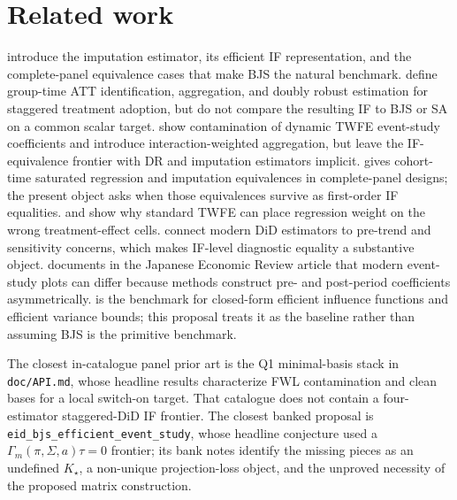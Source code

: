 \documentclass[11pt]{article}
\theoremstyle{definition}
\theoremstyle{plain}
\theoremstyle{remark}
\begin{document}
\section{Related work}
\citet[Theorem 1, Proposition 1, and Appendix B]{borusyak_jaravel_spiess_2024_restud}
introduce the imputation estimator, its efficient IF representation, and the
complete-panel equivalence cases that make BJS the natural benchmark.
\citet[Theorems 1--2 and Section 3.2]{callaway_santanna_2021_joe} define
group-time ATT identification, aggregation, and doubly robust estimation for
staggered treatment adoption, but do not compare the resulting IF to BJS or
SA on a common scalar target.  \citet[Theorem 1 and Section 3.3]{sun_abraham_2021_joe}
show contamination of dynamic TWFE event-study coefficients and introduce
interaction-weighted aggregation, but leave the IF-equivalence frontier with
DR and imputation estimators implicit.  \citet[Proposition 3.1 and Section
5]{wooldridge_2023_ectj} gives cohort-time saturated regression and
imputation equivalences in complete-panel designs; the present object asks
when those equivalences survive as first-order IF equalities.  \citet{
dechaisemartin_dhaultfoeuille_2020_aer} and
\citet{goodman_bacon_2021_joe} show why standard TWFE can place regression
weight on the wrong treatment-effect cells.  \citet{
roth_santanna_bilinski_poe_2023_joe} connect modern DiD estimators to
pre-trend and sensitivity concerns, which makes IF-level diagnostic equality a
substantive object.  \citet{roth_2026_eventstudy_note} documents in the
Japanese Economic Review article that modern event-study plots can differ
because methods construct pre- and post-period coefficients asymmetrically.
\citet[Section 3, EIF display, and efficiency
bound display]{chen_santanna_xie_2025} is the benchmark for closed-form
efficient influence functions and efficient variance bounds; this proposal
treats it as the baseline rather than assuming BJS is the primitive benchmark.

The closest in-catalogue panel prior art is the Q1 minimal-basis stack in
\texttt{doc/API.md}, whose headline results characterize FWL contamination
and clean bases for a local switch-on target.  That catalogue does not contain
a four-estimator staggered-DiD IF frontier.  The closest banked proposal is
\texttt{eid\_bjs\_efficient\_event\_study}, whose headline conjecture used a
$\Gamma_m(\pi,\Sigma,a)\tau=0$ frontier; its bank notes identify the missing
pieces as an undefined $K_\star$, a non-unique projection-loss object, and the
unproved necessity of the proposed matrix construction.
\end{document}
